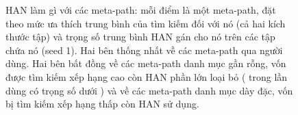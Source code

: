 \begin{figure}[htbp]
  \caption{HAN làm gì với các meta-path: mỗi điểm là một meta-path, đặt theo mức ưa thích trung
    bình của tìm kiếm đối với nó (cả hai kích thước tập) và trọng số trung bình HAN gán cho nó trên
    các tập chứa nó (seed 1). Hai bên thống nhất về các meta-path qua người dùng. Hai bên bất đồng
    về các meta-path danh mục gần rỗng, vốn được tìm kiếm xếp hạng cao còn HAN phần lớn loại bỏ
    ( trong  lần dùng có trọng số dưới
    ) và về các meta-path danh mục dày đặc, vốn bị tìm kiếm xếp hạng thấp còn HAN
    sử dụng.}
  \label{fig:weights}
\end{figure}
